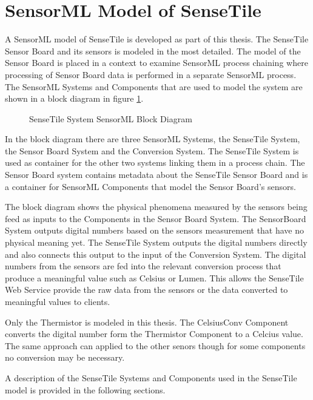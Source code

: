\documentclass[]{final_report}
\begin{document}
\section{SensorML Model of SenseTile}\label{SenseTileModelSec}

A SensorML model of SenseTile is developed as part of this thesis. The SenseTile Sensor Board and its sensors is modeled in the most detailed. The model of the Sensor Board is placed in a context to examine SensorML process chaining where processing of Sensor Board data is performed in a separate SensorML process.  The SensorML Systems and Components that are used to model the system are shown in a  block diagram in figure \ref{fig:SensorML_SenseTile_System_comp}.

\begin{figure}[h]
\centering
{}
\caption{SenseTile System SensorML Block Diagram}\label{fig:SensorML_SenseTile_System_comp}
\end{figure}

In the block diagram there are three SensorML Systems, the SenseTile System, the Sensor Board System and the Conversion System. The SenseTile System is used as container for the other two systems linking them in a process chain. The Sensor Board system contains metadata about the SenseTile Sensor Board and is a container for SensorML Components that model the Sensor Board's sensors.

The block diagram shows the physical phenomena measured by the sensors being feed as inputs to the Components in the Sensor Board System. The SensorBoard System outputs digital numbers based on the sensors measurement that have no physical meaning yet. The SenseTile System outputs the digital numbers directly and also connects this output to the input of the Conversion System. The digital numbers from the sensors are fed into the relevant conversion process that produce a meaningful value such as Celsius or Lumen. This allows the SenseTile Web Service provide the raw data from the sensors or the data converted to meaningful values to clients.

Only the Thermistor is modeled in this thesis. The  CelsiusConv Component converts the digital number form the Thermistor Component to a Celcius value. The same approach can applied to the other senors though for some components no conversion may be necessary.

A description of the SenseTile Systems and Components used in the SenseTile model is provided in the following sections.
\end{document}
